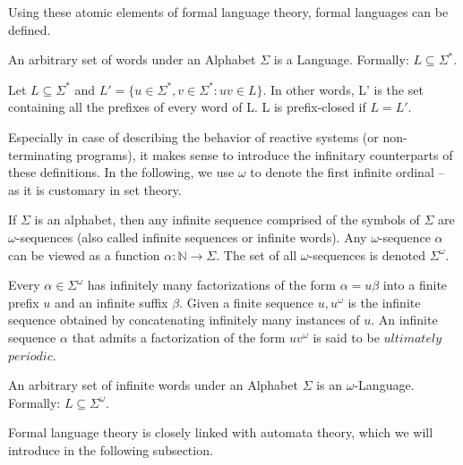 Using these atomic elements of formal language theory, formal languages can be defined.

\begin{definition}
	An arbitrary set of words under an Alphabet $\Sigma$ is a Language. Formally: $L\subseteq\Sigma^{*}$.
\end{definition}

\begin{definition}
	Let $L\subseteq\Sigma^*$ and $L' = \{u\in\Sigma^*, v\in\Sigma^* : uv\in L\}$. In other words, L' is the set containing all the prefixes of every word of L. L is prefix-closed if $L = L'$.
\end{definition}

Especially in case of describing the behavior of reactive systems (or non-terminating programs), it makes sense to introduce the infinitary counterparts of these definitions. In the following, we use $\omega$ to denote the first infinite ordinal -- as it is customary in set theory. %

\begin{definition}
	If $\Sigma$ is an alphabet, then any infinite sequence comprised of the symbols of $\Sigma$ are $\omega$-sequences (also called infinite sequences or infinite words). Any $\omega$-sequence $\alpha$ can be viewed as a function $\alpha: \mathbb{N} \rightarrow \Sigma$. The set of all $\omega$-sequences is denoted $\Sigma^\omega$.
\end{definition}

\begin{definition}
	Every $\alpha \in \Sigma ^ \omega$ has infinitely many factorizations of the form $\alpha = u \beta$ into a finite prefix $u$ and an infinite suffix $\beta$. Given a finite sequence $u, u^\omega$ is the infinite sequence obtained by concatenating infinitely many instances of $u$. An infinite sequence $\alpha$ that admits a factorization of the form $uv^\omega$ is said to be $ultimately$ $periodic$.
\end{definition}

\begin{definition}
	An arbitrary set of infinite words under an Alphabet $\Sigma$ is an $\omega$-Language. Formally: $L\subseteq\Sigma^\omega$.
\end{definition}


Formal language theory is closely linked with automata theory, which we will introduce in the following subsection.

